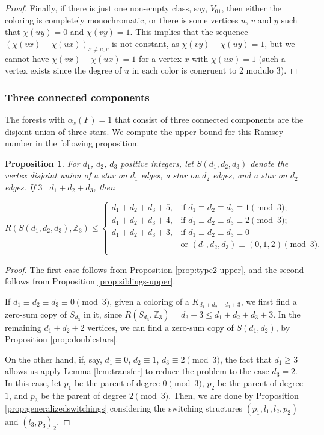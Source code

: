 \documentclass[11pt]{article}
\newtheorem{proposition}[theorem]{Proposition}
\newcommand{\Z}{\mathbb Z}
\begin{document}
\begin{proof}
    Finally, if there is just one non-empty class, say, $V_{01}$, then either the coloring is completely monochromatic, or there is some vertices $u$, $v$ and $y$ such that $\chi(uy)=0$ and $\chi(vy)=1$. This implies that the sequence $(\chi(vx)-\chi(ux))_{x \neq u, v}$ is not constant, as $\chi(vy)-\chi(uy)=1$, but we cannot have $\chi(vx)-\chi(ux)=1$ for a vertex $x$ with $\chi(ux)=1$ (such a vertex exists since the degree of $u$ in each color is congruent to $2$ modulo $3$).

    
    \end{proof}

\subsubsection{Three connected components}\label{subsubsec:3comp}

The forests with $\alpha_s(F)=1$ that consist of three connected components are the disjoint union of three stars. We compute the upper bound for this Ramsey number in the following proposition.

\begin{proposition}\label{prop:triplestars}
        For $d_1$, $d_2$, $d_3$ positive integers, let $S(d_1,d_2,d_3)$ denote the vertex disjoint union of a star on $d_1$ edges, a star on $d_2$ edges, and a star on $d_2$ edges. If $3\mid d_1+d_2+d_3$, then

    \[
R(S(d_1,d_2,d_3),\mathbb{Z}_3) \leq
\begin{cases}            
            d_1+d_2+d_3+5, & \text{if $d_1 \equiv d_2 \equiv d_3 \equiv 1 \pmod 3$;}\\
            d_1+d_2+d_3+4, & \text{if $d_1 \equiv d_2 \equiv d_3 \equiv  2 \pmod 3$;}\\
            d_1+d_2+d_3+3, & \text{if $d_1 \equiv d_2 \equiv d_3 \equiv  0$} \\ & \text{or $(d_1,d_2,d_3) \equiv (0,1,2) \pmod 3$.}\\
\end{cases}
\]
\end{proposition}

\begin{proof}
    The first case follows from Proposition \ref{prop:type2-upper}, and the second follows from Proposition \ref{prop:siblings-upper}.

    If  $d_1 \equiv d_2 \equiv d_3 \equiv 0 \pmod 3$, given a coloring of a $K_{d_1+d_2+d_3+3}$, we first find a zero-sum copy of $S_{d_3}$ in it, since $R(S_{d_3},\Z_3)=d_3+3 \leq d_1+d_2+d_3+3$. In the remaining $d_1+d_2+2$ vertices, we can find a zero-sum copy of $S(d_1,d_2)$, by Proposition \ref{prop:doublestars}. 

    On the other hand, if, say, $d_1 \equiv 0$, $d_2 \equiv 1$, $d_3 \equiv 2 \pmod 3$, the fact that $d_1 \geq 3$ allows us apply Lemma \ref{lem:transfer} to reduce the problem to the case $d_3=2$. In this case, let $p_1$ be the parent of degree $0 \pmod 3$, $p_2$ be the parent of degree $1$, and $p_3$ be the parent of degree $2 \pmod 3$. Then, we are done by Proposition \ref{prop:generalizedswitchings} considering the switching structures $(p_1,l_1,l_2,p_2)$ and $(l_3,p_3)_2$.
\end{proof}
\end{document}
